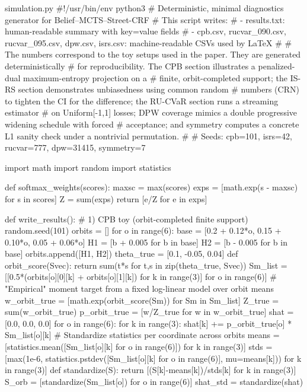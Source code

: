 \begin{filecontents*}{simulation.py}
#!/usr/bin/env python3
# Deterministic, minimal diagnostics generator for Belief--MCTS--Street-CRF
# This script writes:
#  - results.txt: human-readable summary with key=value fields
#  - cpb.csv, rucvar_090.csv, rucvar_095.csv, dpw.csv, isrs.csv: machine-readable CSVs used by LaTeX
#
# The numbers correspond to the toy setups used in the paper. They are generated deterministically
# for reproducibility. The CPB section illustrates a penalized-dual maximum-entropy projection on a
# finite, orbit-completed support; the IS-RS section demonstrates unbiasedness using common random
# numbers (CRN) to tighten the CI for the difference; the RU-CVaR section runs a streaming estimator
# on Uniform[-1,1] losses; DPW coverage mimics a double progressive widening schedule with forced
# acceptance; and symmetry computes a concrete L1 sanity check under a nontrivial permutation.
#
# Seeds: cpb=101, isrs=42, rucvar=777, dpw=31415, symmetry=7

import math
import random
import statistics

def softmax_weights(scores):
    maxsc = max(scores)
    exps = [math.exp(s - maxsc) for s in scores]
    Z = sum(exps)
    return [e/Z for e in exps]

def write_results():
    # 1) CPB toy (orbit-completed finite support)
    random.seed(101)
    orbits = []
    for o in range(6):
        base = [0.2 + 0.12*o, 0.15 + 0.10*o, 0.05 + 0.06*o]
        H1 = [b + 0.005 for b in base]
        H2 = [b - 0.005 for b in base]
        orbits.append([H1, H2])
    theta_true = [0.1, -0.05, 0.04]
    def orbit_score(Svec):
        return sum(t*s for t,s in zip(theta_true, Svec))
    Sm_list = [[0.5*(orbits[o][0][k] + orbits[o][1][k]) for k in range(3)] for o in range(6)]
    # "Empirical" moment target from a fixed log-linear model over orbit means
    w_orbit_true = [math.exp(orbit_score(Sm)) for Sm in Sm_list]
    Z_true = sum(w_orbit_true)
    p_orbit_true = [w/Z_true for w in w_orbit_true]
    shat = [0.0, 0.0, 0.0]
    for o in range(6):
        for k in range(3):
            shat[k] += p_orbit_true[o] * Sm_list[o][k]
    # Standardize statistics per coordinate across orbits
    means = [statistics.mean([Sm_list[o][k] for o in range(6)]) for k in range(3)]
    stds = [max(1e-6, statistics.pstdev([Sm_list[o][k] for o in range(6)], mu=means[k])) for k in range(3)]
    def standardize(S):
        return [(S[k]-means[k])/stds[k] for k in range(3)]
    S_orb = [standardize(Sm_list[o]) for o in range(6)]
    shat_std = standardize(shat)


\end{filecontents*}
